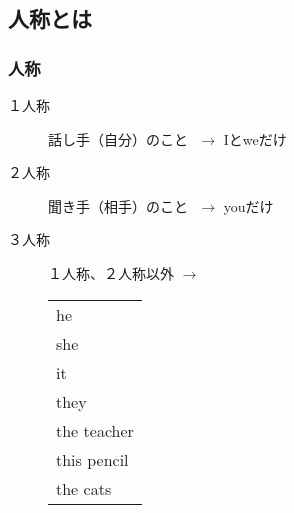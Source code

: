 \documentclass[aspectratio=169]{beamer}
\begin{document}
\subsection{人称とは}
\begin{frame}[plain]\frametitle{人称}
\begin{description}
\item[１人称] 話し手（自分）のこと\pause{}\,\,{} $\longrightarrow$ Iとweだけ\pause
\item[２人称] 聞き手（相手）のこと\pause{}\,\,{} $\longrightarrow$ youだけ\pause
\item[３人称] １人称、２人称以外\pause{}\hspace{15pt} $\longrightarrow$ \begin{tabular}[t]{@{}l}
he\\she\\it\\they\\the teacher\\this pencil\\the cats \end{tabular}
\end{description}
\end{frame}
\end{document}
